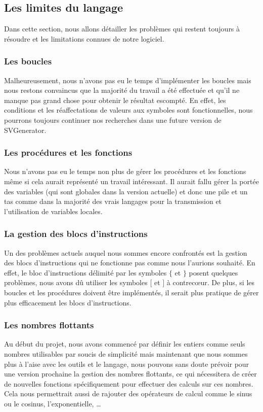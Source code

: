 		\subsection{Les limites du langage}
			Dans cette section, nous allons détailler les problèmes qui restent toujours à résoudre et les limitations connues de notre logiciel.
			
			\subsubsection{Les boucles}
			Malheureusement, nous n'avons pas eu le temps d'implémenter les boucles mais nous restons convaincus que la majorité du travail a été effectuée et qu'il ne manque pas grand chose pour obtenir le résultat escompté. En effet, les conditions et les réaffectations de valeurs aux symboles sont fonctionnelles, nous pourrons toujours continuer nos recherches dans une future version de SVGenerator.
			
			\subsubsection{Les procédures et les fonctions}
			Nous n'avons pas eu le temps non plus de gérer les procédures et les fonctions même si cela aurait représenté un travail intéressant. Il aurait fallu gérer la portée des variables (qui sont globales dans la version actuelle) et donc une pile et un tas comme dans la majorité des vrais langages pour la transmission et l'utilisation de variables locales. 
			
			\subsubsection{La gestion des blocs d'instructions}
			Un des problèmes actuels auquel nous sommes encore confrontés est la gestion des blocs d'instructions qui ne fonctionne pas comme nous l'aurions souhaité. En effet, le bloc d'instructions délimité par les symboles $\{$ et $\}$ posent quelques problèmes, nous avons dû utiliser les symboles $[$ et $]$ à contrecœur. De plus, si les boucles et les procédures doivent être implémentés, il serait plus pratique de gérer plus efficacement les blocs d'instructions.
			
			\subsubsection{Les nombres flottants}
			Au début du projet, nous avons commencé par définir les entiers comme seuls nombres utilisables par soucis de simplicité mais maintenant que nous sommes plus à l'aise avec les outils et le langage, nous pouvons sans doute prévoir pour une version prochaine la gestion des nombres flottants, ce qui nécessitera de créer de nouvelles fonctions spécifiquement pour effectuer des calculs sur ces nombres. Cela nous permettrait aussi de rajouter des opérateurs de calcul comme le sinus ou le cosinus, l'exponentielle, \dots
			
